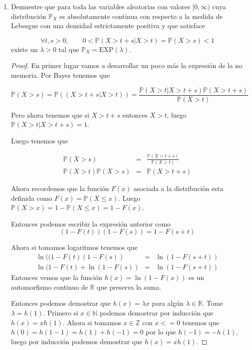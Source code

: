 \documentclass[paper=letter, fontsize=11pt]{scrartcl} %
\numberwithin{equation}{section} %
\numberwithin{figure}{section} %
\numberwithin{table}{section} %
\newcommand{\prob}[1]{\mathbb{P}(#1)}
\begin{document}
\begin{enumerate}[label = \arabic*)]
\item Demuestre que para toda las variables aleatorias con valores $ [0, \infty) $ cuya distribución $ \mathbb{P}_X $ es absolutamente continua con respecto a la medida de Lebesgue con una densidad estrictamente positiva y que satisface

\begin{equation}
\forall t,s > 0,\qquad 0 <\prob{X>t+s|X>t}=\prob{X>s}<1 \nonumber
\end{equation}
existe un $ \lambda > 0 $ tal que $ \mathbb{P}_X = \text{EXP}(\lambda) $.

\begin{proof}
En primer lugar vamos a desarrollar un poco más la expresión de la no memoria. Por Bayes tenemos que

\begin{equation}
\prob{X>s}=\prob{(X>t+s|X>t)}=\frac{\prob{X>t|X>t+s}\prob{X>t+s}}{\prob{X>t}} \nonumber
\end{equation}

Pero ahora tenemos que si $ X>t+s $ entonces $ X>t $, luego $ \prob{X>t|X>t+s} = 1 $.

Luego tenemos que

\begin{eqnarray}
\prob{X>s}&=&\frac{\prob{X>t+s}}{\prob{X>t}} \nonumber
\\\prob{X>t}\prob{X>s}&=&\prob{X>t+s} \nonumber
\end{eqnarray}

Ahora recordemos que la función $ F(x) $ asociada a la distribución esta definida como $ F(x)= \prob{X\leq x} $. Luego $ \prob{X>x}= 1-\prob{X \leq x} = 1 - F(x) $.

Entonces podemos escribir la expresión anterior como
\begin{equation}
(1-F(t))(1-F(s))=1-F(s+t) \nonumber
\end{equation}

Ahora si tomamos logaritmos tenemos que
\begin{eqnarray}
\ln((1-F(t)(1-F(s))&=&\ln(1-F(s+t)) \nonumber
\\\ln(1-F(t)+\ln(1-F(s))&=&\ln(1-F(s+t)) \nonumber
\end{eqnarray}
Entonces vemos que la función $ h(x)=\ln(1-F(x)) $ es un automorfismo continuo de $ \mathbb{R} $ que preserva la suma.

Entonces podemos demostrar que $ h(x)= \lambda x $ para algún $ \lambda \in \mathbb{R} $. Tome $ \lambda = h(1) $. Primero si $ x \in \mathbb{N} $ podemos demostrar por inducción que $ h(x)=xh(1) $. Ahora si tomamos $ x \in \mathbb{Z} $ con $ x <= 0 $ tenemos que $ h(0)=h(1-1)=h(1)+h(-1)=0 $ por lo que $ h(-1)=-h(1) $, luego por inducción podemos demostrar que $ h(x)=xh(1) $.


\end{proof}
\end{enumerate}
\end{document}
